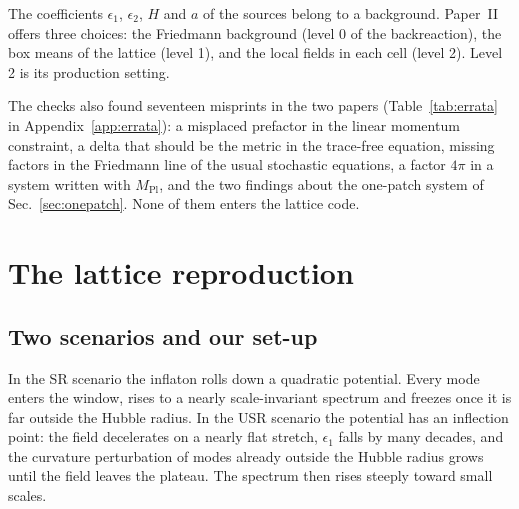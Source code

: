 \documentclass[aps,prd,twocolumn,10pt,superscriptaddress,nofootinbib,longbibliography,floatfix]{revtex4-2}
\newcommand{\Mpl}{M_\mathrm{Pl}}
\newcommand{\Ptwo}{Paper~II}
\begin{document}
The coefficients $\epsilon_1$, $\epsilon_2$, $H$ and $a$ of the sources belong to a background. \Ptwo{} offers three choices: the Friedmann background (level 0 of the backreaction), the box means of the lattice (level 1), and the local fields in each cell (level 2). Level 2 is its production setting.

The checks also found seventeen misprints in the two papers (Table~\ref{tab:errata} in Appendix~\ref{app:errata}): a misplaced prefactor in the linear momentum constraint, a delta that should be the metric in the trace-free equation, missing factors in the Friedmann line of the usual stochastic equations, a factor $4\pi$ in a system written with $\Mpl$, and the two findings about the one-patch system of Sec.~\ref{sec:onepatch}. None of them enters the lattice code.

\section{The lattice reproduction}\label{sec:lattice}

\subsection{Two scenarios and our set-up}\label{sec:setup}

In the SR scenario the inflaton rolls down a quadratic potential. Every mode enters the window, rises to a nearly scale-invariant spectrum and freezes once it is far outside the Hubble radius. In the USR scenario the potential has an inflection point: the field decelerates on a nearly flat stretch, $\epsilon_1$ falls by many decades, and the curvature perturbation of modes already outside the Hubble radius grows until the field leaves the plateau. The spectrum then rises steeply toward small scales.
\end{document}
